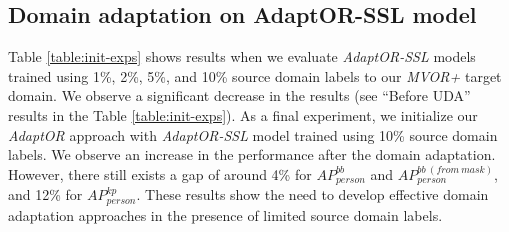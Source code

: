 {\blue \subsection{Domain adaptation on AdaptOR-SSL model}
Table \ref{table:init-exps} shows results when we evaluate \emph{AdaptOR-SSL} models trained using 1\%, 2\%, 5\%, and 10\% source domain labels to our \emph{MVOR+} target domain. We observe a significant decrease in the results (see ``Before UDA'' results in the Table \ref{table:init-exps}). As a final experiment, we initialize our \emph{AdaptOR} approach with \emph{AdaptOR-SSL} model trained using 10\% source domain labels. We observe an increase in the performance after the domain adaptation. However, there still exists a gap of around 4\% for \emph{$AP_{person}^{bb}$} and \emph{$AP_{person}^{bb\ (from\ mask)}$}, and 12\% for \emph{$AP_{person}^{kp}$}. These results show the need to develop effective domain adaptation approaches in the presence of limited source domain labels.}



























































































%
